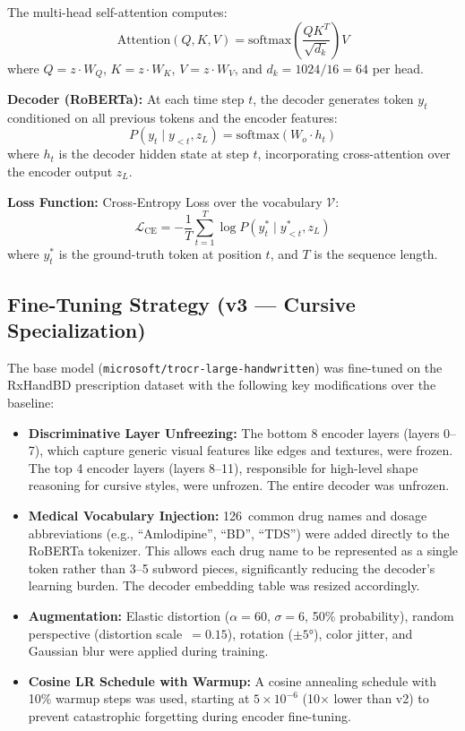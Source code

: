 \documentclass[12pt,a4paper,oneside]{report}
\begin{document}
The multi-head self-attention computes:
\begin{equation}
\text{Attention}(Q, K, V) = \text{softmax}\left(\frac{QK^T}{\sqrt{d_k}}\right) V
\end{equation}
where $Q = z \cdot W_Q$, $K = z \cdot W_K$, $V = z \cdot W_V$, and $d_k = 1024 / 16 = 64$ per head.

\textbf{Decoder (RoBERTa):} At each time step $t$, the decoder generates token $y_t$ conditioned on all previous tokens and the encoder features:
\begin{equation}
P(y_t \mid y_{<t}, z_L) = \text{softmax}(W_o \cdot h_t)
\end{equation}
where $h_t$ is the decoder hidden state at step $t$, incorporating cross-attention over the encoder output $z_L$.

\textbf{Loss Function:} Cross-Entropy Loss over the vocabulary $\mathcal{V}$:
\begin{equation}
\mathcal{L}_{\text{CE}} = -\frac{1}{T} \sum_{t=1}^{T} \log P(y_t^{*} \mid y_{<t}^{*}, z_L)
\end{equation}
where $y_t^{*}$ is the ground-truth token at position $t$, and $T$ is the sequence length.

\subsection{Fine-Tuning Strategy (v3 — Cursive Specialization)}

The base model (\texttt{microsoft/trocr-large-handwritten}) was fine-tuned on the RxHandBD prescription dataset with the following key modifications over the baseline:

\begin{itemize}
  \item \textbf{Discriminative Layer Unfreezing:} The bottom 8 encoder layers (layers 0--7), which capture generic visual features like edges and textures, were frozen. The top 4 encoder layers (layers 8--11), responsible for high-level shape reasoning for cursive styles, were unfrozen. The entire decoder was unfrozen.
  \item \textbf{Medical Vocabulary Injection:} 126~common drug names and dosage abbreviations (e.g., ``Amlodipine'', ``BD'', ``TDS'') were added directly to the RoBERTa tokenizer. This allows each drug name to be represented as a single token rather than 3--5 subword pieces, significantly reducing the decoder's learning burden. The decoder embedding table was resized accordingly.
  \item \textbf{Augmentation:} Elastic distortion ($\alpha=60$, $\sigma=6$, 50\% probability), random perspective (distortion scale~$=0.15$), rotation ($\pm5°$), color jitter, and Gaussian blur were applied during training.
  \item \textbf{Cosine LR Schedule with Warmup:} A cosine annealing schedule with 10\% warmup steps was used, starting at $5 \times 10^{-6}$ (10$\times$ lower than v2) to prevent catastrophic forgetting during encoder fine-tuning.
\end{itemize}
\end{document}
